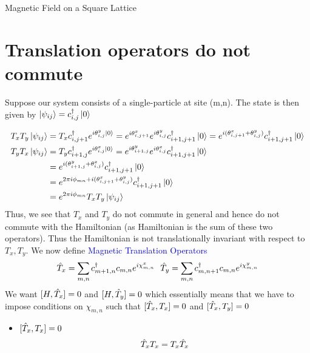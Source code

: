 \documentclass[12pt, oneside, listof=totoc,dvipsnames]{scrbook}
\begin{document}
\begin{chapter}{Magnetic Field on a Square Lattice}
		\section{Translation operators do not commute}
		Suppose our system consists of a single-particle at site (m,n). The state is then given by $\ket{\psi_{ij}}= c^\dagger_{i,j}\ket{0}$
		
		
		
		\begin{align*}
			T_xT_y\ket{\psi_{ij}} &=T_x c^\dagger_{i,j+1}e^{i\theta^y_{i,j} \ket{0}}=e^{i\theta^x_{i,j+1}}e^{i\theta^y_{i,j}}c^\dagger_{i+1,j+1} \ket{0}=e^{i(\theta^x_{i,j+1}+\theta^y_{i,j})}
			c^\dagger_{i+1,j+1} \ket{0}\\
			T_yT_x\ket{\psi_{ij}} &=T_y c^\dagger_{i+1,j}e^{i\theta^x_{i,j} \ket{0}}=e^{i\theta^y_{i+1,j}}e^{i\theta^x_{i,j}}c^\dagger_{i+1,j+1} \ket{0}\\&=e^{i(\theta^y_{i+1,j}+\theta^x_{i,j})} c^\dagger_{i+1,j+1} \ket{0}\\
			&=e^{2\pi i \phi_{mn}+i(\theta^x_{i,j+1}+\theta^y_{i,j})} c^\dagger_{i+1,j+1} \ket{0}\\
			&=e^{2\pi i \phi_{mn}}T_xT_y\ket{\psi_{ij}}
		\end{align*}
		Thus, we see that $T_x$ and $T_y$ do not commute in general and hence do not commute with the Hamiltonian (as Hamiltonian is the sum of these two operators). Thus the Hamiltonian is not translationally invariant with respect to $T_x, T_y$.
		We now define \textcolor{blue}{Magnetic Translation Operators}
		\[\hat{T}_x = \sum \limits_{m,n} c^\dagger_{m+1,n}c_{m,n}e^{i\chi^x_{m,n}} \ \ \hat{T}_y = \sum \limits_{m,n} c^\dagger_{m,n+1}c_{m,n}e^{i\chi^y_{m,n}}\]
		We want $[H,\hat{T}_x]=0$ and $[H,\hat{T}_y]=0$ which essentially means that we have to impose conditions on $\chi_{m,n}$ such that $[\hat{T}_x,T_x]=0$ and $[\hat{T}_x,T_y]=0$
		\begin{itemize}
			\item $[\hat{T}_x,T_x]=0$ 
			\begin{align*}
				\hat{T}_xT_x=T_x\hat{T}_x
			\end{align*}
		\end{itemize}
	\end{chapter}
	
	
	
	
	
\end{document}
